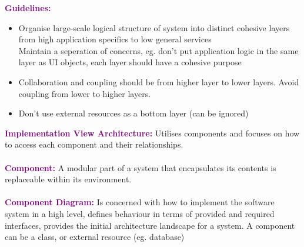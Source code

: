 \documentclass[a4paper,10pt]{article}
\begin{document}
\textcolor{Purple}{\textbf{Guidelines:}}
\renewcommand{\labelitemi}{\textperiodcentered}
\begin{itemize}
\item Organise large-scale logical structure of system into distinct cohesive layers from high application specifics to low general services\\
Maintain a seperation of concerns, eg. don't put application logic in the same layer as UI objects, each layer should have a cohesive purpose
\item Collaboration and coupling should be from higher layer to lower layers. Avoid coupling from lower to higher layers. 
\item Don't use external resources as a bottom layer (can be ignored)
\end{itemize}
\textcolor{Purple}{\textbf{Implementation View Architecture:}} Utilises components and focuses on how to access each component and their relationships.\\\\
\textcolor{Purple}{\textbf{Component:}} A modular part of a system that encapsulates its contents is replaceable within its environment.\\\\
\textcolor{Purple}{\textbf{Component Diagram:}} Is concerned with how to implement the software system in a high level, defines behaviour in terms of provided and required interfaces, provides the initial architecture landscape for a system. A component can be a class, or external resource (eg. database)
\newpage 
\end{document}
